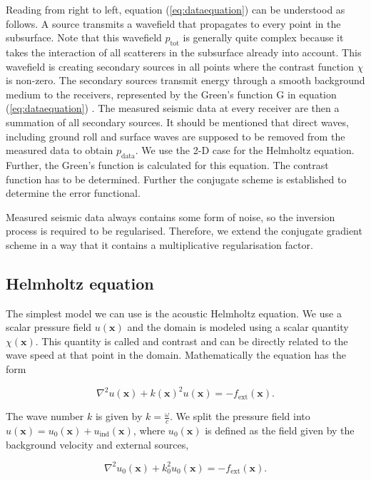 \documentclass[10pt,a4paper]{article}
\begin{document}
Reading from right to left, equation (\ref{eq:dataequation}) can be understood as follows. A source transmits a wavefield that propagates to every point in the subsurface. Note that this wavefield $p_\text{tot}$ is generally quite complex because it takes the interaction of all scatterers in the subsurface already into account. This wavefield is creating secondary sources in all points where the contrast function $\chi$ is non-zero. The secondary sources transmit energy through a smooth background medium to the receivers, represented by the Green's function G in equation (\ref{eq:dataequation}) . The measured seismic data at every receiver are then a summation of all secondary sources. It should be mentioned that direct waves, including ground roll and surface waves are supposed to be removed from the measured data to obtain $p_\text{data}$.
We use the 2-D case for the Helmholtz equation. Further, the Green's function is calculated for this equation. The contrast function has to be determined. Further the conjugate scheme is established to determine the error functional. 

Measured seismic data always contains some form of noise, so the inversion process is required to be regularised. Therefore, we extend the conjugate gradient scheme in a way that it contains a multiplicative regularisation factor. 

\subsection{Helmholtz equation}

The simplest model we can use is the acoustic Helmholtz equation. We use a scalar pressure field $u(\mathbf{x})$ and the domain is modeled using a scalar quantity $\chi(\mathbf{x})$. This quantity is called and contrast and can be directly related to the wave speed at that point in the domain. Mathematically the equation has the form

\begin{equation} \label{eq:helmholtz}
\nabla^2 u(\mathbf{x}) + k(\mathbf{x})^2 u(\mathbf{x}) = -f_{\text{ext}}(\mathbf{x}).
\end{equation} 

The wave number $k$ is given by $k = \frac{\omega}{c}$. We split the pressure field into $u(\mathbf{x}) = u_0(\mathbf{x}) + u_{\text{ind}}(\mathbf{x})$, where $u_0(\mathbf{x})$ is defined as the field given by the background velocity and external sources,

\begin{equation} \label{eq:reference}
\nabla^2 u_0(\mathbf{x}) + k_0^2 u_0(\mathbf{x}) = -f_{\text{ext}}(\mathbf{x}).
\end{equation} 
\end{document}
